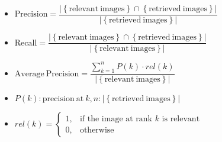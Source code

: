 \documentclass[11pt, a4paper, landscape]{article}
\begin{document}
\appendix
\NewPage{}
\vfill
\begin{itemize}
\item $\mathrm{Precision} = \dfrac{\lvert \left\lbrace \mathrm{relevant\ images} \right\rbrace \cap \left\lbrace \mathrm{retrieved\ images} \right\rbrace \rvert}{\lvert \left\lbrace \mathrm{retrieved\ images} \right\rbrace \rvert}$
\item $\mathrm{Recall} = \dfrac{\lvert \left\lbrace \mathrm{relevant\ images} \right\rbrace \cap \left\lbrace \mathrm{retrieved\ images} \right\rbrace \rvert}{\lvert \left\lbrace \mathrm{relevant\ images} \right\rbrace \rvert}$
\item $\mathrm{Average\ Precision} = \dfrac{\sum\limits_{k = 1}^{n} P(k)\cdot rel(k)}{\lvert \left\lbrace \mathrm{relevant\ images} \right\rbrace \rvert}$
\item $P(k): \mathrm{precision\ at\ } k, n: \lvert \left\lbrace \mathrm{retrieved\ images} \right\rbrace \rvert$
\item $rel(k) = \begin{cases} 1, & \mbox{if the image at rank } k\mbox{ is relevant} \\ 0, & \mbox{otherwise} \end{cases}$
\end{itemize}
\vfill
\end{document}
